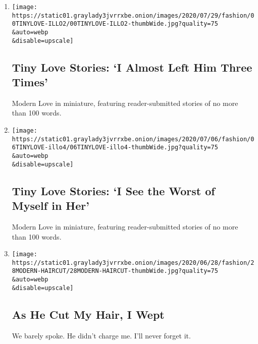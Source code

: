 \begin{enumerate}
\def\labelenumi{\arabic{enumi}.}
\item
  \href{/2020/08/04/style/tiny-modern-love-stories-coronavirus-i-almost-left-him.html}{}

  \texttt{[image: https://static01.graylady3jvrrxbe.onion/images/2020/07/29/fashion/00TINYLOVE-ILLO2/00TINYLOVE-ILLO2-thumbWide.jpg?quality=75\\\&auto=webp\\\&disable=upscale]}

  \hypertarget{tiny-love-stories-i-almost-left-him-three-times}{%
  \subsection{Tiny Love Stories: `I Almost Left Him Three
  Times'}\label{tiny-love-stories-i-almost-left-him-three-times}}

  Modern Love in miniature, featuring reader-submitted stories of no
  more than 100 words.
\item
  \href{/2020/06/30/style/tiny-modern-love-stories-coronavirus-i-see-the-worst-of-myself-in-her.html}{}

  \texttt{[image: https://static01.graylady3jvrrxbe.onion/images/2020/07/06/fashion/06TINYLOVE-illo4/06TINYLOVE-illo4-thumbWide.jpg?quality=75\\\&auto=webp\\\&disable=upscale]}

  \hypertarget{tiny-love-stories-i-see-the-worst-of-myself-in-her}{%
  \subsection{Tiny Love Stories: `I See the Worst of Myself in
  Her'}\label{tiny-love-stories-i-see-the-worst-of-myself-in-her}}

  Modern Love in miniature, featuring reader-submitted stories of no
  more than 100 words.
\item
  \href{/2020/06/26/style/modern-love-coronavirus-as-he-cut-my-hair-i-wept.html}{}

  \texttt{[image: https://static01.graylady3jvrrxbe.onion/images/2020/06/28/fashion/28MODERN-HAIRCUT/28MODERN-HAIRCUT-thumbWide.jpg?quality=75\\\&auto=webp\\\&disable=upscale]}

  \hypertarget{as-he-cut-my-hair-i-wept}{%
  \subsection{As He Cut My Hair, I
  Wept}\label{as-he-cut-my-hair-i-wept}}

  We barely spoke. He didn't charge me. I'll never forget it.


\end{enumerate}
